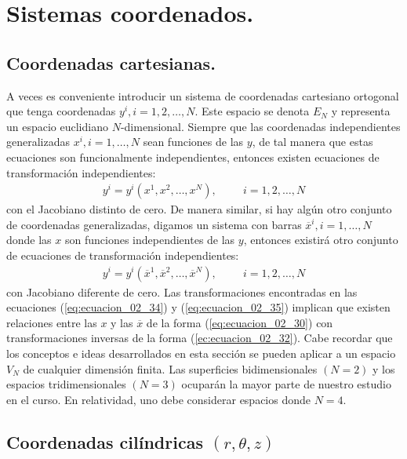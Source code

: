 \section{Sistemas coordenados.}

\subsection{Coordenadas cartesianas.}

A veces es conveniente introducir un sistema de coordenadas cartesiano ortogonal que tenga coordenadas $y^{i}, i = 1, 2,\ldots, N$. Este espacio se denota $E_{N}$ y representa un espacio euclidiano $N$-dimensional. Siempre que las coordenadas independientes generalizadas $x^{i}, i = 1, \ldots, N$ sean funciones de las $y$, de tal manera que estas ecuaciones son funcionalmente independientes, entonces existen ecuaciones de transformación independientes:
\begin{align}
y^{i} = y^{i} (x^{1}, x^{2}, \ldots, x^{N}), \hspace{1cm} i = 1, 2, \ldots, N
\label{eq:ecuacion_02_34}
\end{align}
con el Jacobiano distinto de cero. De manera similar, si hay algún otro conjunto de coordenadas generalizadas, digamos un sistema con barras $\overline{x}^{i}, i = 1, \ldots, N$ donde las $x$ son funciones independientes de las $y$, entonces existirá otro conjunto de ecuaciones de transformación independientes:
\begin{align}
y^{i} = y^{i} (\overline{x}^{1}, \overline{x}^{2}, \ldots, \overline{x}^{N}), \hspace{1cm} i = 1, 2, \ldots, N
\label{eq:ecuacion_02_35}
\end{align}
con Jacobiano diferente de cero. Las transformaciones encontradas en las ecuaciones (\ref{eq:ecuacion_02_34}) y (\ref{eq:ecuacion_02_35}) implican que existen relaciones entre las $x$ y las $\overline{x}$ de la forma (\ref{eq:ecuacion_02_30}) con transformaciones inversas de la forma (\ref{ec:ecuacion_02_32}). Cabe recordar que los conceptos e ideas desarrollados en esta sección se pueden aplicar a un espacio $V_{N}$ de cualquier dimensión finita. Las superficies bidimensionales $(N = 2)$ y los espacios tridimensionales $(N = 3)$ ocuparán la mayor parte de nuestro estudio en el curso. En relatividad, uno debe considerar espacios donde $N = 4$.

\subsection{Coordenadas cilíndricas \texorpdfstring{$(r, \theta, z)$}{(r, q, z)}}

